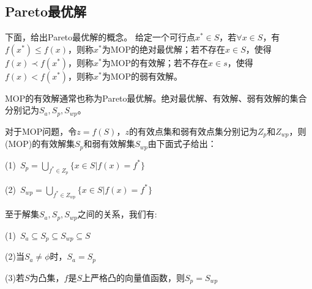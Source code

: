     \subsection{Pareto最优解}
        \par
        下面，给出Pareto最优解的概念。
        给定一个可行点$x^* \in S$，若$\forall x \in S$，有$f(x^*)\leqslant f(x)$，则称$x^*$为MOP的绝对最优解；若不存在$x \in S$，使得$f(x)\prec f(x^*)$，则称$x^*$为MOP的有效解；若不存在$x \in s$，使得$f(x)< f(x^*)$，则称$x^*$为MOP的弱有效解。
        \par
        MOP的有效解通常也称为Pareto最优解。绝对最优解、有效解、弱有效解的集合分别记为$S_a,S_p,S_{wp}$。
        \begin{theorem}
        对于MOP问题，令$z=f(S)$，$z$的有效点集和弱有效点集分别记为$Z_p$和$Z_{wp}$，则(MOP)的有效解集$S_p$和弱有效解集$S_{wp}$由下面式子给出：
        \par
        (1)\ $S_p=\mathop{\bigcup}\limits_{f^*\in Z_p}\{x\in S|f(x)=f^*\}$
        \par
        (2)\ $S_{wp}=\mathop{\bigcup}\limits_{f^*\in Z_{wp}}\{x\in S|f(x)=f^*\}$
        \end{theorem}
        \par
        至于解集$S_a,S_p,S_{wp}$之间的关系，我们有:
        \par
        (1)\ $S_a \subseteq S_p\subseteq S_{wp} \subseteq S$
        \par
        (2)当$S_{a} \neq \phi$时，$S_a = S_p$
        \par
        (3)若$S$为凸集，$f$是$S$上严格凸的向量值函数，则$S_p=S_{wp}$

